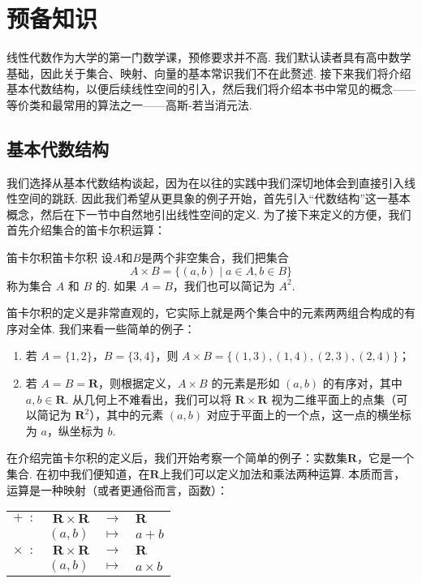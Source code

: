 \chapter{预备知识}

线性代数作为大学的第一门数学课，预修要求并不高. 我们默认读者具有高中数学基础，因此关于集合、映射、向量的基本常识我们不在此赘述. 接下来我们将介绍基本代数结构，以便后续线性空间的引入，然后我们将介绍本书中常见的概念——等价类和最常用的算法之一——高斯-若当消元法.

\section{基本代数结构}

我们选择从基本代数结构谈起，因为在以往的实践中我们深切地体会到直接引入线性空间的跳跃. 因此我们希望从更具象的例子开始，首先引入``代数结构''这一基本概念，然后在下一节中自然地引出线性空间的定义. 为了接下来定义的方便，我们首先介绍集合的笛卡尔积运算：

\begin{definition}{笛卡尔积}{笛卡尔积} 
    设$A$和$B$是两个非空集合，我们把集合
    \[A \times B = \{(a,b) \mid a \in A, b \in B\}\]
    称为集合 $A$ 和 $B$ 的. 如果 $A = B$，我们也可以简记为 $A^2$.
\end{definition}

笛卡尔积的定义是非常直观的，它实际上就是两个集合中的元素两两组合构成的有序对全体. 我们来看一些简单的例子：

\begin{example}{}{}
    \begin{enumerate}
        \item 若 $A = \{1,2\}$，$B = \{3,4\}$，则 $A \times B=\{(1,3),(1,4),(2,3),(2,4)\}$；
        \item 若 $A = B = \mathbf{R}$，则根据定义，$A \times B$ 的元素是形如 $(a,b)$ 的有序对，其中 $a, b \in \mathbf{R}$. 从几何上不难看出，我们可以将 $\mathbf{R} \times \mathbf{R}$ 视为二维平面上的点集（可以简记为 $\mathbf{R}^2$），其中的元素 $(a,b)$ 对应于平面上的一个点，这一点的横坐标为 $a$，纵坐标为 $b$.
    \end{enumerate}
\end{example}

在介绍完笛卡尔积的定义后，我们开始考察一个简单的例子：实数集$\mathbf{R}$，它是一个集合. 在初中我们便知道，在$\mathbf{R}$上我们可以定义加法和乘法两种运算. 本质而言，运算是一种映射（或者更通俗而言，函数）：

\begin{center}
    \begin{tabular}{rrcl}
        $+\enspace\colon$      & $\mathbf{R}\times\mathbf{R}$ & $\to$     & $\mathbf{R}$ \\
                               & $(a,b)$                      & $\mapsto$ & $a+b$        \\
        $\times\enspace\colon$ & $\mathbf{R}\times\mathbf{R}$ & $\to$     & $\mathbf{R}$ \\
                               & $(a,b)$                      & $\mapsto$ & $a\times b$
    \end{tabular}
\end{center}

